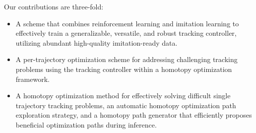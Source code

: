 Our contributions are three-fold:
\begin{itemize}
    \item A scheme that combines reinforcement learning and imitation learning to effectively train a generalizable, versatile, and robust tracking controller, utilizing abundant high-quality imitation-ready data.
    \item A per-trajectory optimization scheme for addressing challenging tracking problems using the tracking controller within a homotopy optimization framework.
    \item A homotopy optimization method for effectively solving difficult single trajectory tracking problems, an automatic homotopy optimization path exploration strategy, and a homotopy path generator that efficiently proposes beneficial optimization paths during inference.
\end{itemize}


